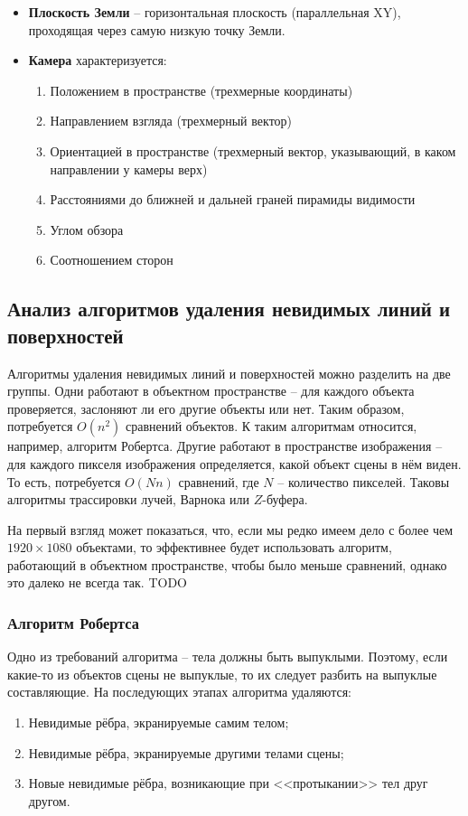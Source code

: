 \begin{itemize}
    \item \textbf{Плоскость Земли} -- горизонтальная плоскость (параллельная {XY}), проходящая через самую низкую точку {Земли}.
    \item \textbf{Камера} характеризуется:
        \begin{enumerate}[label=(\alph*)]
            \item Положением в пространстве (трехмерные координаты)
            \item Направлением взгляда (трехмерный вектор)
            \item Ориентацией в пространстве (трехмерный вектор, указывающий, в каком направлении у камеры верх)
            \item Расстояниями до ближней и дальней граней пирамиды видимости
            \item Углом обзора
            \item Соотношением сторон
        \end{enumerate}
\end{itemize}

\subsection{Анализ алгоритмов удаления невидимых линий и поверхностей}

Алгоритмы удаления невидимых линий и поверхностей можно разделить на две
группы. Одни работают в объектном пространстве -- для каждого объекта
проверяется, заслоняют ли его другие объекты или нет. Таким образом,
потребуется $O(n^2)$ сравнений объектов. К таким алгоритмам относится,
например, алгоритм Робертса. Другие работают в пространстве изображения -- для
каждого пикселя изображения определяется, какой объект сцены в нём виден. То
есть, потребуется $O(Nn)$ сравнений, где $N$ -- количество пикселей. Таковы
алгоритмы трассировки лучей, Варнока или $Z$-буфера.

На первый взгляд может показаться, что, если мы редко имеем дело с более чем
$1920 \times 1080$ объектами, то эффективнее будет использовать алгоритм,
работающий в объектном пространстве, чтобы было меньше сравнений, однако это
далеко не всегда так. TODO

\subsubsection{Алгоритм Робертса}

Одно из требований алгоритма -- тела должны быть выпуклыми. Поэтому, если
какие-то из объектов сцены не выпуклые, то их следует разбить на выпуклые
составляющие. На последующих этапах алгоритма удаляются:
\begin{enumerate}
    \item Невидимые рёбра, экранируемые самим телом;
    \item Невидимые рёбра, экранируемые другими телами сцены;
    \item Новые невидимые рёбра, возникающие при <<протыкании>> тел друг
        другом.
\end{enumerate}

